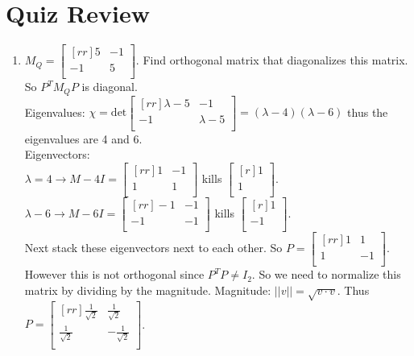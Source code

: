 \documentclass{report}
\begin{document}
\section{Quiz Review}
\begin{enumerate}
\item $M_Q = \begin{bmatrix}[rr]5&-1\\-1&5\\\end{bmatrix}$. Find orthogonal matrix that diagonalizes this matrix. So $P^TM_QP$ is diagonal.\\
Eigenvalues: $\chi = \mathrm{det}\begin{bmatrix}[rr]\lambda-5 & -1\\-1&\lambda-5\\\end{bmatrix} = (\lambda-4)(\lambda-6)$ thus the eigenvalues are 4 and 6.\\
Eigenvectors:\\
$\lambda=4 \rightarrow M-4I = \begin{bmatrix}[rr]1&-1\\1&1\\\end{bmatrix}$ kills $\begin{bmatrix}[r]1\\1\\\end{bmatrix}$.\\
$\lambda-6 \rightarrow M-6I = \begin{bmatrix}[rr]-1&-1\\-1&-1\\\end{bmatrix}$ kills $\begin{bmatrix}[r]1\\-1\\\end{bmatrix}$.\\
Next stack these eigenvectors next to each other. So $P=\begin{bmatrix}[rr]1&1\\1&-1\\\end{bmatrix}$. However this is not orthogonal since $P^TP \neq I_2$. So we need to normalize this matrix by dividing by the magnitude. Magnitude: $||v||=\sqrt{v\cdot v}$. Thus $P=\begin{bmatrix}[rr]\frac{1}{\sqrt{2}}&\frac{1}{\sqrt{2}}\\\frac{1}{\sqrt{2}}&-\frac{1}{\sqrt{2}}\\\end{bmatrix}$.
\end{enumerate}
\end{document}
